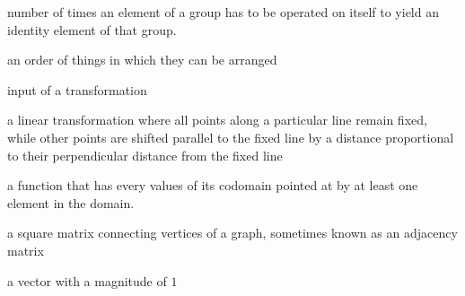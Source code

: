 \documentclass[../gatm.tex]{subfiles}
\begin{document}
\begin{description}[align=left]
\item[period] number of times an element of a group has to be operated on itself to yield an identity element of that group.

\item[permutation] an order of things in which they can be arranged

\item[preimage] input of a transformation

\item[shear] a linear transformation where all points along a particular line remain fixed, while other points are shifted parallel to the fixed line by a distance proportional to their perpendicular distance from the fixed line

\item[surjective function] a function that has every values of its codomain pointed at by at least one element in the domain.

\item[transportation matrix] a square matrix connecting vertices of a graph, sometimes known as an adjacency matrix

\item[unit vector] a vector with a magnitude of $1$

\end{description}
\end{document}
